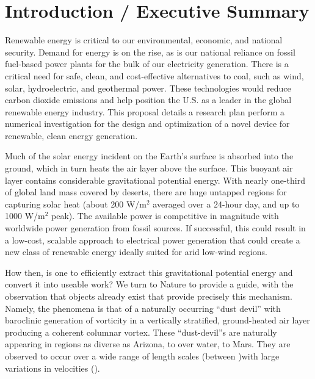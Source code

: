 \section{Introduction / Executive Summary}

Renewable energy is critical to our environmental, economic, and
national security. Demand for energy is on the rise, as is our national
reliance on fossil fuel-based power plants for the bulk of our
electricity generation. There is a critical need for safe, clean, and
cost-effective alternatives to coal, such as wind, solar, hydroelectric,
and geothermal power\cite{arpa-e}. These technologies would reduce carbon dioxide
emissions and help position the U.S. as a leader in the global renewable
energy industry. 
%
%
This proposal details a research plan perform a numerical investigation
for the design and optimization of a novel device for renewable, clean
energy generation. 

Much of the solar energy incident on the Earth's surface is absorbed
into the ground, which in turn heats the air layer above the surface.
This buoyant air layer contains considerable gravitational potential
energy. 
With nearly one-third of global land mass covered by deserts, there are huge
untapped regions for capturing solar heat (about 200 W/$\text{m}^2$ averaged over
a 24-hour day, and up to 1000 W/$\text{m}^2$ peak).  The available power is
competitive in magnitude with worldwide power generation from fossil
sources. If successful, this could result in a low-cost, scalable
approach to electrical power generation that could create a new class of
renewable energy ideally suited for arid low-wind regions. 

How then, is one to efficiently extract this gravitational potential
energy and convert it into useable work? We turn to Nature to provide a 
guide, with the observation that objects already
exist that provide precisely this mechanism. Namely, the phenomena is
that of a naturally 
%
%
occurring ``dust devil'' with baroclinic generation of vorticity in a
vertically stratified, ground-heated air layer producing a coherent
columnar vortex. These ``dust-devil''s are naturally appearing in
regions as diverse as Arizona, to over water, to Mars\cite{mars}. They
are observed to occur over a wide range of length scales (between )with
large variations in 
velocities ()\cite{sinclair}. 

